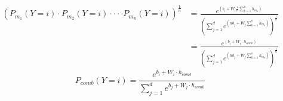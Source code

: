 \documentclass{article} %
\begin{document}
\begin{equation}
\begin{split}
(P_{m_{1}}(Y=i)\cdot P_{m_{2}}(Y=i)\cdot\cdot \cdot \cdot P_{m_{n}}(Y=i))^{\frac{1}{n}}&=\frac{e^{(b_{i}+W_{i}\frac{1}{n}\sum_{k=1}^{n}h_{m_{k}})}}{(\sum_{j=1}^{d}e^{(nb_{j}+W_{j}\sum_{k=1}^{n}h_{m_{k}})})^{\frac{1}{n}}}
 \\
           &= \frac{e^{(b_{i}+W_{i}\cdot h_{comb})}}{(\sum_{j=1}^{d}e^{(nb_{j}+W_{j}\sum_{k=1}^{n}h_{m_{k}})})^{\frac{1}{n}}}
\end{split}
\end{equation}
\begin{equation}
P_{comb}(Y=i)=\frac{e^{b_{i}+W_{i}\cdot h_{comb}}}{\sum_{j=1}^{d}e^{b_{j}+W_{j}\cdot h_{comb}}}
\end{equation}
\end{document}
